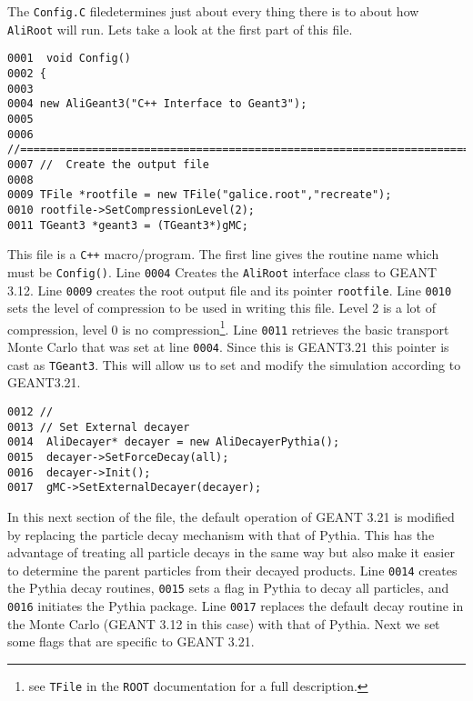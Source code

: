 The \texttt{Config.C} file\footnotemark determines just about every thing there
is to about how \texttt{AliRoot} will run. Lets take a look at the first part
of this file.


\scriptsize
\begin{verbatim}
0001  void Config()
0002 {
0003 
0004 new AliGeant3("C++ Interface to Geant3");
0005 
0006 //=======================================================================
0007 //  Create the output file
0008 
0009 TFile *rootfile = new TFile("galice.root","recreate");
0010 rootfile->SetCompressionLevel(2);
0011 TGeant3 *geant3 = (TGeant3*)gMC;
\end{verbatim}
\normalsize

This file is a \texttt{C++} macro/program. The first line gives the routine
name which must be \texttt{Config()}. Line \texttt{0004} Creates the
\texttt{AliRoot} interface class to GEANT 3.12. Line \texttt{0009} creates the
root output file and its pointer \texttt{rootfile}. Line \texttt{0010} sets the
level of compression to be used in writing this file. Level 2 is a lot of
compression, level 0 is no compression\footnote{see \texttt{TFile} in the
\texttt{ROOT} documentation for a full description.}. Line \texttt{0011}
retrieves the basic transport Monte Carlo that was set at line
\texttt{0004}. Since this is GEANT3.21 this pointer is cast as
\texttt{TGeant3}. This will allow us to set and modify the simulation according
to GEANT3.21.

\scriptsize
\begin{verbatim}
0012 //
0013 // Set External decayer
0014  AliDecayer* decayer = new AliDecayerPythia();
0015  decayer->SetForceDecay(all);
0016  decayer->Init();
0017  gMC->SetExternalDecayer(decayer);
\end{verbatim}
\normalsize

In this next section of the file, the default operation of GEANT 3.21 is
modified by replacing the particle decay mechanism with that of Pythia. This
has the advantage of treating all particle decays in the same way but also make
it easier to determine the parent particles from their decayed products. Line
\texttt{0014} creates the Pythia decay routines, \texttt{0015} sets a flag
in Pythia to decay all particles, and \texttt{0016} initiates the Pythia
package. Line \texttt{0017} replaces the default decay routine in the Monte
Carlo (GEANT 3.12 in this case) with that of Pythia. Next we set some flags
that are specific to GEANT 3.21.

